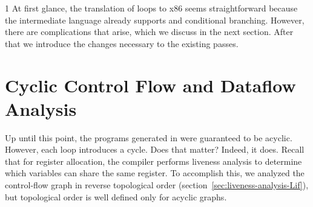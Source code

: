 \documentclass[7x10]{TimesAPriori_MIT}%
\def\pythonEd{1}
\def\edition{1}
\newcommand{\pythonColor}[0]{}
\numberwithin{theorem}{chapter}
\numberwithin{definition}{chapter}
\numberwithin{equation}{chapter}
\begin{document}
{\if\edition\pythonEd\pythonColor
%
At first glance, the translation of  loops to x86 seems
straightforward because the \LangCIf{} intermediate language already
supports  and conditional branching. However, there are
complications that arise, which we discuss in the next section. After
that we introduce the changes necessary to the existing passes.
%
\fi}

\section{Cyclic Control Flow and Dataflow Analysis}
\label{sec:dataflow-analysis}

Up until this point, the programs generated in
 were guaranteed to be acyclic. However, each
 loop introduces a cycle. Does that matter?
%
Indeed, it does.  Recall that for register allocation, the compiler
performs liveness analysis to determine which variables can share the
same register.  To accomplish this, we analyzed the control-flow graph
in reverse topological order
(section~\ref{sec:liveness-analysis-Lif}), but topological order is
well defined only for acyclic graphs.
\end{document}
